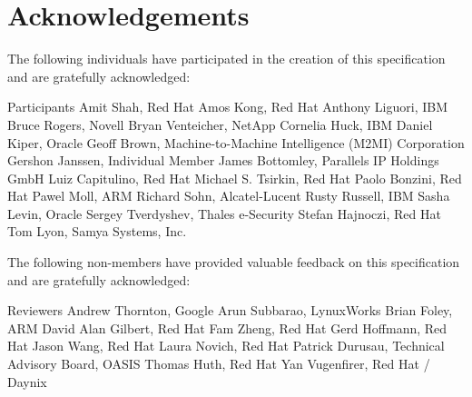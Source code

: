 \chapter{Acknowledgements}\label{chap:Acknowledgements}

The following individuals have participated in the creation of this specification and are gratefully acknowledged:

\begin{oasistitlesection}{Participants}
Amit Shah,	Red Hat	\newline
Amos Kong,	Red Hat	\newline
Anthony Liguori,	IBM	\newline
Bruce Rogers,	Novell	\newline
Bryan Venteicher,	NetApp	\newline
Cornelia Huck,	IBM	\newline
Daniel Kiper,	Oracle	\newline
Geoff Brown,	Machine-to-Machine Intelligence (M2MI) Corporation	\newline
Gershon Janssen,	Individual Member	\newline
James Bottomley,	Parallels IP Holdings GmbH	\newline
Luiz Capitulino,	Red Hat	\newline
Michael S. Tsirkin,	Red Hat	\newline
Paolo Bonzini,	Red Hat	\newline
Pawel Moll,	ARM \newline
Richard Sohn,	Alcatel-Lucent \newline
Rusty Russell,	IBM	\newline
Sasha Levin,	Oracle	\newline
Sergey Tverdyshev,	Thales e-Security	\newline
Stefan Hajnoczi,	Red Hat	\newline
Tom Lyon,	Samya Systems, Inc.	\newline
\end{oasistitlesection}

The following non-members have provided valuable feedback on this
specification and are gratefully acknowledged:

\begin{oasistitlesection}{Reviewers}
Andrew Thornton,  Google \newline
Arun Subbarao,	LynuxWorks	\newline
Brian Foley,  ARM \newline
David Alan Gilbert, Red Hat \newline
Fam Zheng, Red Hat	\newline
Gerd Hoffmann, Red Hat	\newline
Jason Wang, Red Hat \newline
Laura Novich, Red Hat	\newline
Patrick Durusau,	Technical Advisory Board, OASIS	\newline
Thomas Huth,	Red Hat	\newline
Yan Vugenfirer, Red Hat / Daynix	\newline
\end{oasistitlesection}
